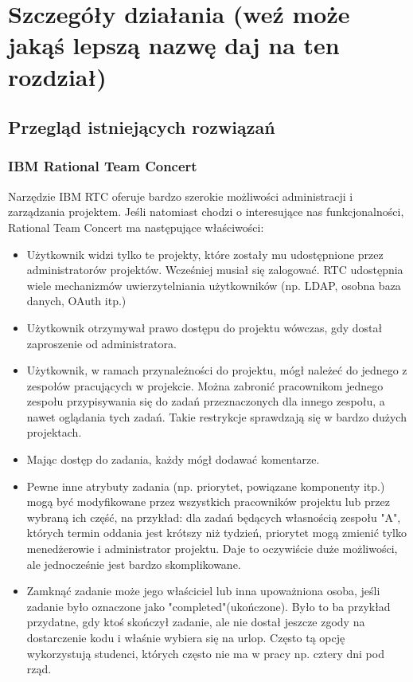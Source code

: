 \documentclass[a4paper,12pt,notitlepage]{mwrep}
\begin{document}
\chapter{Szczegóły działania (weź może jakąś lepszą nazwę daj na ten rozdział)}
\section{Przegląd istniejących rozwiązań}
\subsection{IBM Rational Team Concert}
Narzędzie IBM RTC oferuje bardzo szerokie możliwości administracji i zarządzania projektem. Jeśli natomiast chodzi o interesujące nas funkcjonalności, Rational Team Concert ma następujące właściwości:
\begin{itemize}
	\item	Użytkownik widzi tylko te projekty, które zostały mu udostępnione przez administratorów projektów. Wcześniej musiał się zalogować. RTC udostępnia wiele mechanizmów uwierzytelniania użytkowników (np. LDAP, osobna baza danych, OAuth itp.)
	\item	Użytkownik otrzymywał prawo dostępu do projektu wówczas, gdy dostał zaproszenie od administratora.
	\item	Użytkownik, w ramach przynależności do projektu, mógł należeć do jednego z zespołów pracujących w projekcie. Można zabronić pracownikom jednego zespołu przypisywania się do zadań przeznaczonych dla innego zespołu, a nawet oglądania tych zadań. Takie restrykcje sprawdzają się w bardzo dużych projektach.
	\item	Mając dostęp do zadania, każdy mógł dodawać komentarze.
	\item	Pewne inne atrybuty zadania (np. priorytet, powiązane komponenty itp.) mogą być modyfikowane przez wszystkich pracowników projektu lub przez wybraną ich część, na przykład: dla zadań będących własnością zespołu "A", których termin oddania jest krótszy niż tydzień, priorytet mogą zmienić tylko menedżerowie i administrator projektu. Daje to oczywiście duże możliwości, ale jednocześnie jest bardzo skomplikowane.
	\item	Zamknąć zadanie może jego właściciel lub inna upoważniona osoba, jeśli zadanie było oznaczone jako "completed"(ukończone). Było to ba przykład przydatne, gdy ktoś skończył zadanie, ale nie dostał jeszcze zgody na dostarczenie kodu i właśnie wybiera się na urlop. Często tą opcję wykorzystują studenci, których często nie ma w pracy np. cztery dni pod rząd.
\end{itemize}
\end{document}
